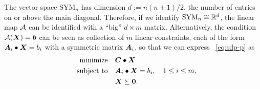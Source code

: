 The vector space $\mathrm{SYM}_n$ has dimension $d:=n(n+1)/2$, the number of entries on or above the main diagonal. Therefore, if we identify $\mathrm{SYM}_n\cong \mathbb{R}^{d}$, the linear map $\mathcal{\bm{A}}$ can be identified with a ``big'' $d\times m$ matrix. Alternatively, the condition $\mathcal{\bm{A}}(\bm{X})=\bm{b}$ can be seen as collection of $m$ linear constraints, each of the form $\bm{A}_i\bullet \bm{X}=b_i$ with a symmetric matrix $\bm{A}_i$, so that we can express ~\eqref{eq:sdp-p} as
\begin{align*}
 \text{minimize}\quad & \bm{C}\bullet \bm{X}\\
 \quad\text{subject to}\quad & \bm{A}_i\bullet \bm{X} = b_i, \quad 1\leq i\leq m,\\
 & \bm{X}\succeq \bm{0}.
\end{align*}

